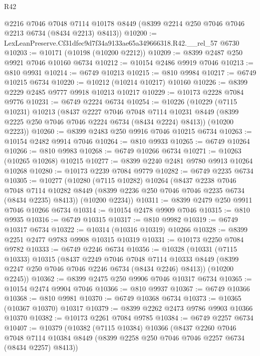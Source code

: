 \begin{lexlean}{R42}
\begin{coremodule}
{      @2216
      @7046
      @7048
      @7114
      @10178
      @8449
      (@8399 @2214 @250 @7046 @7046 @2213 @6734 (@8434 @2213) @8413))
@10200 := LexLeanPreserve.Cf31dfec9d7f34a9133ae65a349666318.R42.__rel_57 @6730
@10203 := @10171 (@10198 (@10200 @2212))
@10209 := @8399 @2487 @250 @9921 @7046 @10160 @6734
@10212 := @10154 @2486 @9919 @7046
@10213 := @810 @9931
@10214 := @6749 @10213
@10215 := @810 @9984
@10217 := @6749 @10215 @6734
@10220 := @10212 (@10214 @10217) @10160
@10226 := @8399 @2229 @2485 @9777 @9918 @10213 @10217
@10229 := @10173 @2228 @7084 @9776
@10231 := @6749 @2224 @6734
@10254 := @10226
    (@10229
      (@7115 @10231)
      @10213
      (@8437
        @2227
        @7046
        @7048
        @7114
        @10231
        @8449
        (@8399 @2225 @250 @7046 @7046 @2224 @6734 (@8434 @2224) @8413))
      (@10200 @2223))
@10260 := @8399 @2483 @250 @9916 @7046 @10215 @6734
@10263 := @10154 @2482 @9914 @7046
@10264 := @810 @9933
@10265 := @6749 @10264
@10266 := @810 @9983
@10268 := @6749 @10266 @6734
@10271 := @10263 (@10265 @10268) @10215
@10277 := @8399 @2240 @2481 @9780 @9913 @10264 @10268
@10280 := @10173 @2239 @7084 @9779
@10282 := @6749 @2235 @6734
@10305 := @10277
    (@10280
      (@7115 @10282)
      @10264
      (@8437
        @2238
        @7046
        @7048
        @7114
        @10282
        @8449
        (@8399 @2236 @250 @7046 @7046 @2235 @6734 (@8434 @2235) @8413))
      (@10200 @2234))
@10311 := @8399 @2479 @250 @9911 @7046 @10266 @6734
@10314 := @10154 @2478 @9909 @7046
@10315 := @810 @9935
@10316 := @6749 @10315
@10317 := @810 @9982
@10319 := @6749 @10317 @6734
@10322 := @10314 (@10316 @10319) @10266
@10328 := @8399 @2251 @2477 @9783 @9908 @10315 @10319
@10331 := @10173 @2250 @7084 @9782
@10333 := @6749 @2246 @6734
@10356 := @10328
    (@10331
      (@7115 @10333)
      @10315
      (@8437
        @2249
        @7046
        @7048
        @7114
        @10333
        @8449
        (@8399 @2247 @250 @7046 @7046 @2246 @6734 (@8434 @2246) @8413))
      (@10200 @2245))
@10362 := @8399 @2475 @250 @9906 @7046 @10317 @6734
@10365 := @10154 @2474 @9904 @7046
@10366 := @810 @9937
@10367 := @6749 @10366
@10368 := @810 @9981
@10370 := @6749 @10368 @6734
@10373 := @10365 (@10367 @10370) @10317
@10379 := @8399 @2262 @2473 @9786 @9903 @10366 @10370
@10382 := @10173 @2261 @7084 @9785
@10384 := @6749 @2257 @6734
@10407 := @10379
    (@10382
      (@7115 @10384)
      @10366
      (@8437
        @2260
        @7046
        @7048
        @7114
        @10384
        @8449
        (@8399 @2258 @250 @7046 @7046 @2257 @6734 (@8434 @2257) @8413))
}
\end{coremodule}
\end{lexlean}
